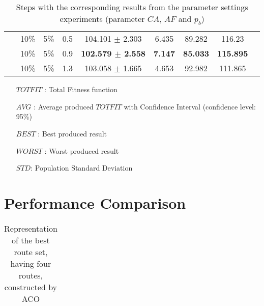 \begin{table}
\begin{tabular}{|l|l|l|c||c|c|c|c|c|}
    ~ & 10\% & 5\% & 0.5 & 104.101 $\pm$ 2.303 & 6.435 &89.282 & 116.23\\
    ~ & 10\% & 5\% & 0.9 & \textbf{102.579 $\pm$ 2.558} & \textbf{7.147} & \textbf{85.033} & \textbf{115.895}\\
    ~ & 10\% & 5\% & 1.3 & 103.058 $\pm$ 1.665 & 4.653 & 92.982 & 111.865\\
    \hline
    \end{tabular}
    \caption {Steps with the corresponding results from the parameter settings experiments (parameter $CA$, $AF$ and $p_b$)}
    \tiny
    \begin{itemize}[noitemsep]
    \item[$TOTFIT$ :] Total Fitness function
    \item[$AVG$ :] Average produced $TOTFIT$ with Confidence Interval (confidence level: 95\%)
    \item[$BEST$ :] Best produced result
    \item[$WORST$ :] Worst produced result
    \item[$STD$:] Population Standard Deviation 
    \end{itemize}
    \label{table:pm2}
\end{table}


\section{Performance Comparison}

\begin{table}[H]
    \centering
    \begin{tabular}{|l|llllllll|}
    \hline
    \hline
    \end{tabular}
    \caption {Representation of the best route set, having four routes, constructed by ACO}
    \label{table:performanceComparison_bestRouteSet4_ACO}
\end{table}

